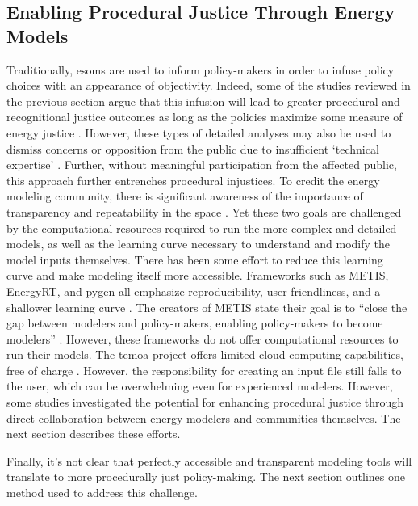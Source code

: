 \subsection{Enabling Procedural Justice Through Energy Models}

Traditionally, \acp{esom} are used to inform policy-makers \cite{li_open_2020}
in order to infuse policy choices with an appearance of objectivity. Indeed,
some of the studies reviewed in the previous section argue that this infusion
will lead to greater procedural and recognitional justice outcomes as long as
the policies maximize some measure of energy justice
\cite{chapman_prioritizing_2018, heffron_resolving_2015}. However, these types
of detailed analyses may also be used to dismiss concerns or opposition from the
public due to insufficient `technical expertise' \cite{johnson_dakota_2021}.
Further, without meaningful participation from the affected public, this
approach further entrenches procedural injustices. To credit the energy
modeling community, there is significant awareness of the importance of
transparency and repeatability in the space \cite{decarolis_case_2012,
pfenninger_energy_2014, pfenninger_openmod_2022, forster_open_2022,
hilpert_open_2018}. Yet these two goals are challenged by the computational
resources required to run the more complex and detailed models, as well as the
learning curve necessary to understand and modify the model inputs themselves.
There has been some effort to reduce this learning curve and make modeling
itself more accessible. Frameworks such as METIS, EnergyRT, and \ac{pygen} all
emphasize reproducibility, user-friendliness, and a shallower learning curve
\cite{sakellaris_metis_2018, lugovoy_energyrt_2022, dotson_python_2021}. The
creators of METIS state their goal is to ``close the gap between modelers and
policy-makers, enabling policy-makers to become modelers''
\cite{sakellaris_metis_2018}. However, these frameworks do not offer
computational resources to run their models. The \ac{temoa} project offers
limited cloud computing capabilities, free of charge
\cite{temoa_project_temoa_2023}. However, the responsibility for creating an
input file still falls to the user, which can be overwhelming even for
experienced modelers. However, some studies investigated the potential for enhancing
procedural justice through direct collaboration between energy modelers
and communities themselves. The next section describes these efforts.


Finally, it's not clear that perfectly accessible and
transparent modeling tools will translate to more procedurally just
policy-making. The next section outlines one method used to address this
challenge.


